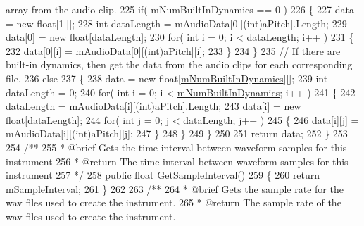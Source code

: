\begin{DoxyCodeInclude}
{       array from the audio clip.}
225         \textcolor{keywordflow}{if}( mNumBuiltInDynamics == 0 )
226         \{
227             data = \textcolor{keyword}{new} \textcolor{keywordtype}{float}[1][];
228             \textcolor{keywordtype}{int} dataLength = mAudioData[0][(int)aPitch].Length;
229             data[0] = \textcolor{keyword}{new} \textcolor{keywordtype}{float}[dataLength];
230             \textcolor{keywordflow}{for}( \textcolor{keywordtype}{int} i = 0; i < dataLength; i++ )
231             \{
232                 data[0][i] = mAudioData[0][(int)aPitch][i];
233             \}
234         \}
235         \textcolor{comment}{// If there are built-in dynamics, then get the data from the audio clips for each corresponding
       file.}
236         \textcolor{keywordflow}{else}
237         \{
238             data = \textcolor{keyword}{new} \textcolor{keywordtype}{float}[\hyperlink{group___v_i_base_pro_var_gac265f64f759d267ee1e1680f8d387011}{mNumBuiltInDynamics}][];
239             \textcolor{keywordtype}{int} dataLength = 0;
240             \textcolor{keywordflow}{for}( \textcolor{keywordtype}{int} i = 0; i < \hyperlink{group___v_i_base_pro_var_gac265f64f759d267ee1e1680f8d387011}{mNumBuiltInDynamics}; i++ )
241             \{
242                 dataLength = mAudioData[i][(int)aPitch].Length;
243                 data[i] = \textcolor{keyword}{new} \textcolor{keywordtype}{float}[dataLength];
244                 \textcolor{keywordflow}{for}( \textcolor{keywordtype}{int} j = 0; j < dataLength; j++ )
245                 \{
246                     data[i][j] = mAudioData[i][(int)aPitch][j];
247                 \}
248             \}
249         \}
250 
251         \textcolor{keywordflow}{return} data;
252     \}
253 \textcolor{comment}{}
254 \textcolor{comment}{    /**}
255 \textcolor{comment}{     * @brief Gets the time interval between waveform samples for this instrument}
256 \textcolor{comment}{     * @return The time interval between waveform samples for this instrument}
257 \textcolor{comment}{     */}
258     \textcolor{keyword}{public} \textcolor{keywordtype}{float} \hyperlink{group___v_i_base_pub_func_gabea22c3ab14c6989b9357da0bf052fbc}{GetSampleInterval}()
259     \{
260         \textcolor{keywordflow}{return} \hyperlink{group___v_i_base_pro_var_ga20c1d3d25ea666378d72c833d160ae2e}{mSampleInterval};
261     \}
262 \textcolor{comment}{}
263 \textcolor{comment}{    /**}
264 \textcolor{comment}{     * @brief Gets the sample rate for the wav files used to create the instrument.}
265 \textcolor{comment}{     * @return The sample rate of the wav files used to create the instrument.}

\end{DoxyCodeInclude}
